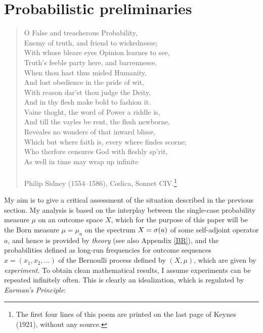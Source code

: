 \documentclass[11pt,a4paper]{article}
\numberwithin{equation}{section}
\begin{document}
 \section{Probabilistic preliminaries}\label{PP}
\begin{quote}\begin{small}
O False and treacherous Probability,\\
Enemy of truth, and friend to wickednesse;\\
With whose bleare eyes Opinion learnes to see,\\
Truth's feeble party here, and barrennesse.\\
When thou hast thus misled Humanity, \\
And lost obedience in the pride of wit, \\
With reason dar'st thou judge the Deity, \\
And in thy flesh make bold to fashion it. \\
Vaine thoght, the word of Power a riddle is, \\
And till the vayles be rent, the flesh newborne, \\
Reveales no wonders of that inward blisse, \\
Which but where faith is, every where findes scorne; \\
Who therfore censures God with fleshly sp'rit, \\
As well in time may wrap up infinite\\
\mbox{} \\
Philip Sidney (1554--1586), C\oe lica, Sonnet CIV.\footnote{The first four lines of this poem are printed on the last page  of Keynes (1921), without any source.}
\end{small}\end{quote}
My aim is to give a critical assessment of the situation described in the previous section. My analysis is based on the interplay between the single-case probability measure $\mu$ on an outcome space $X$, which for the purpose of this paper will  be the Born measure $\mu=\mu_a$ on the spectrum $X=\sigma(a)$ of some self-adjoint operator $a$,  and hence is provided by \emph{theory} (see also Appendix \ref{BR}), and the probabilities defined as long-run frequencies for outcome sequences $x=(x_1, x_2, \ldots)$ of the Bernoulli process defined by $(X,\mu)$, which are given by \emph{experiment}. To obtain clean mathematical results, I assume experiments can be repeated infinitely often. This is clearly  an idealization, which is regulated by \emph{Earman's Principle}:
\end{document}
